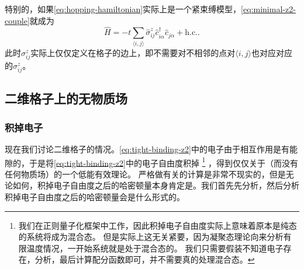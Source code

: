 \documentclass[hyperref, UTF8, a4paper]{ctexart}
\newcommand*{\pair}[1]{\langle #1 \rangle}
\newcommand*{\Ztwo}{$\mathbb{Z}_2$}
\begin{document}
特别的，如果\eqref{eq:hopping-hamiltonian}实际上是一个紧束缚模型，\eqref{eq:minimal-z2-couple}就成为
\begin{equation}
    \hat{H} = - t \sum_{\pair{i, j}} \hat{\sigma}^z_{ij} \hat{c}_{i \alpha}^\dagger \hat{c}_{j \alpha} + \text{h.c.}.
    \label{eq:tight-binding-z2}
\end{equation}
此时$\sigma_{ij}^z$实际上仅仅定义在格子的边上，即不需要对不相邻的点对$\pair{i, j}$也对应对应的$\sigma_{ij}^z$。

\subsection{二维格子上的无物质场}

\subsubsection{积掉电子}

现在我们讨论二维格子的情况。\eqref{eq:tight-binding-z2}中的电子由于相互作用是有能隙的，于是将\eqref{eq:tight-binding-z2}中的电子自由度积掉%
\footnote{我们在正则量子化框架中工作，因此积掉电子自由度实际上意味着原本是纯态的系统将成为混合态。
但是实际上这无关紧要，因为凝聚态理论向来分析有限温度情况，一开始系统就是处于混合态的。
我们只需要假装不知道电子存在，分析，最后计算配分函数即可，并不需要真的处理混合态。}%
，得到仅仅关于（而没有任何物质场）的一个低能有效理论。
严格做有关的计算是非常不现实的，但是无论如何，积掉电子自由度之后的哈密顿量本身肯定是。我们首先先分析，然后分析积掉电子自由度之后的哈密顿量会是什么形式的。
\end{document}
